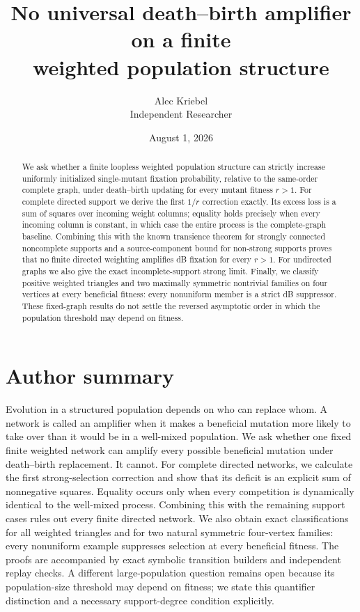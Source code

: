 \documentclass[11pt]{article}
\title{No universal death--birth amplifier on a finite\\
weighted population structure}
\author{Alec Kriebel\\Independent Researcher}
\date{August 1, 2026}
\begin{document}
\maketitle

\begin{abstract}
We ask whether a finite loopless weighted population structure can strictly
increase uniformly initialized single-mutant fixation probability, relative
to the same-order complete graph, under death--birth updating for every mutant
fitness $r>1$.  For complete directed support we derive the first $1/r$
correction exactly.  Its excess loss is a sum of squares over incoming weight
columns; equality holds precisely when every incoming column is constant, in
which case the entire process is the complete-graph baseline.  Combining this
with the known transience theorem for strongly connected noncomplete supports
and a source-component bound for non-strong supports proves that no finite
directed weighting amplifies dB fixation for every $r>1$.  For undirected graphs we
also give the exact incomplete-support strong limit.  Finally, we classify
positive weighted triangles and two maximally symmetric nontrivial families
on four vertices at every beneficial fitness: every nonuniform member is a
strict dB suppressor.  These fixed-graph results do not settle the reversed
asymptotic order in which the population threshold may depend on fitness.
\end{abstract}

\section*{Author summary}

Evolution in a structured population depends on who can replace whom.  A
network is called an amplifier when it makes a beneficial mutation more likely
to take over than it would be in a well-mixed population.  We ask whether one
fixed finite weighted network can amplify every possible beneficial mutation
under death--birth replacement.  It cannot.  For complete directed networks,
we calculate the first strong-selection correction and show that its deficit
is an explicit sum of nonnegative squares.  Equality occurs only when every
competition is dynamically identical to the well-mixed process.  Combining
this with the remaining support cases rules out every finite directed
network.  We also obtain exact classifications for all weighted triangles and
for two natural symmetric four-vertex families: every nonuniform example
suppresses selection at every beneficial fitness.  The proofs are accompanied
by exact symbolic transition builders and independent replay checks.  A
different large-population question remains open because its population-size
threshold may depend on fitness; we state this quantifier distinction and a
necessary support-degree condition explicitly.
\end{document}
